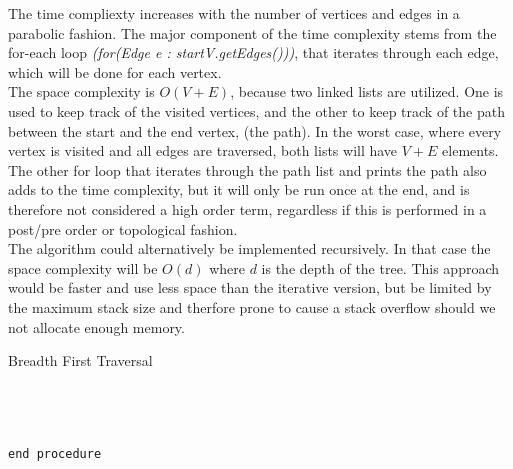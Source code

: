 \documentclass[a4paper]{article}
\begin{document}
The time compliexty increases with the number of vertices and edges in a parabolic fashion.
The major component of the time complexity stems from the for-each loop \textit{(for(Edge e : startV.getEdges()))},
that iterates through each edge, which will be done for each vertex. \\

The space complexity is $O(V+E)$, because two linked lists are utilized.
One is used to keep track of the visited vertices, and the other to keep track of the path between the start and the end vertex, (the path).
In the worst case, where every vertex is visited and all edges are traversed, both lists will have $V + E$ elements. \\

The other for loop that iterates through the path list and prints the path also adds to the time complexity,
but it will only be run once at the end, and is therefore not considered a high order term, regardless if this is performed in a
post/pre order or topological fashion. \\

The algorithm could alternatively be implemented recursively.
In that case the space complexity will be $O(d)$ where $d$ is the depth of the tree.
This approach would be faster and use less space than the iterative version,
but be limited by the maximum stack size and therfore prone to cause a stack overflow should we 
not allocate enough memory.


\pagebreak
\vspace*{-1.5cm}
\begin{algorithm}
\caption{Breadth First Traversal}\label{euclid}
\begin{algorithmic}[1]
 \\

 \\
\State{}
\State{}
\State\quad{}
\State\quad{}
\State\quad\quad{}
\State\quad\quad{}
\State\quad{}
\State{}
 \\

{\tt end procedure}
\EndProcedure
\end{algorithmic}
\end{algorithm}
\end{document}
